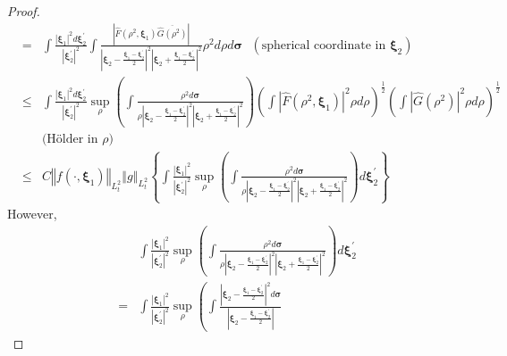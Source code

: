 \documentclass[reqno]{amsart}
\theoremstyle{plain}
\numberwithin{equation}{section}
\begin{document}
\begin{proof}
\begin{eqnarray*}
&=&\int \frac{\left\vert \mathbf{\xi }_{1}\right\vert ^{2}d\mathbf{\xi }_{2}^{\prime }}{\left\vert \mathbf{\xi }_{2}^{\prime }\right\vert ^{2}}\int 
\frac{\left\vert \hat{F}(\rho ^{2},\mathbf{\xi }_{1})\overline{\hat{G}(\rho
^{2})}\right\vert }{\left\vert \mathbf{\xi }_{2}-\frac{\mathbf{\xi }_{1}-\mathbf{\xi }_{2}^{\prime }}{2}\right\vert ^{2}\left\vert \mathbf{\xi }_{2}+\frac{\mathbf{\xi }_{1}-\mathbf{\xi }_{2}^{\prime }}{2}\right\vert ^{2}}\rho
^{2}d\rho d\mathbf{\sigma }\text{ }\left( \text{spherical coordinate in }\mathbf{\xi }_{2}\right) \\
&\leqslant &\int \frac{\left\vert \mathbf{\xi }_{1}\right\vert ^{2}d\mathbf{\xi }_{2}^{\prime }}{\left\vert \mathbf{\xi }_{2}^{\prime }\right\vert ^{2}}\sup_{\rho }\left( \int \frac{\rho ^{2}d\mathbf{\sigma }}{\rho \left\vert 
\mathbf{\xi }_{2}-\frac{\mathbf{\xi }_{1}-\mathbf{\xi }_{2}^{\prime }}{2}\right\vert ^{2}\left\vert \mathbf{\xi }_{2}+\frac{\mathbf{\xi }_{1}-\mathbf{\xi }_{2}^{\prime }}{2}\right\vert ^{2}}\right) \left( \int \left\vert \hat{F}(\rho ^{2},\mathbf{\xi }_{1})\right\vert ^{2}\rho d\rho \right) ^{\frac{1}{2}}\left( \int \left\vert \hat{G}(\rho ^{2})\right\vert ^{2}\rho d\rho
\right) ^{\frac{1}{2}} \\
&&\text{(H\"{o}lder in }\rho \text{)} \\
&\leqslant &C\left\Vert f(\cdot ,\mathbf{\xi }_{1})\right\Vert
_{L_{t}^{2}}\left\Vert g\right\Vert _{L_{t}^{2}}\left\{ \int \frac{\left\vert \mathbf{\xi }_{1}\right\vert ^{2}}{\left\vert \mathbf{\xi }_{2}^{\prime }\right\vert ^{2}}\sup_{\rho }\left( \int \frac{\rho ^{2}d\mathbf{\sigma }}{\rho \left\vert \mathbf{\xi }_{2}-\frac{\mathbf{\xi }_{1}-\mathbf{\xi }_{2}^{\prime }}{2}\right\vert ^{2}\left\vert \mathbf{\xi }_{2}+\frac{\mathbf{\xi }_{1}-\mathbf{\xi }_{2}^{\prime }}{2}\right\vert ^{2}}\right) d\mathbf{\xi }_{2}^{\prime }\right\}
\end{eqnarray*}However,\begin{eqnarray*}
&&\int \frac{\left\vert \mathbf{\xi }_{1}\right\vert ^{2}}{\left\vert 
\mathbf{\xi }_{2}^{\prime }\right\vert ^{2}}\sup_{\rho }\left( \int \frac{\rho ^{2}d\mathbf{\sigma }}{\rho \left\vert \mathbf{\xi }_{2}-\frac{\mathbf{\xi }_{1}-\mathbf{\xi }_{2}^{\prime }}{2}\right\vert ^{2}\left\vert \mathbf{\xi }_{2}+\frac{\mathbf{\xi }_{1}-\mathbf{\xi }_{2}^{\prime }}{2}\right\vert
^{2}}\right) d\mathbf{\xi }_{2}^{\prime } \\
&=&\int \frac{\left\vert \mathbf{\xi }_{1}\right\vert ^{2}}{\left\vert 
\mathbf{\xi }_{2}^{\prime }\right\vert ^{2}}\sup_{\rho }\left( \int \frac{\left\vert \mathbf{\xi }_{2}-\frac{\mathbf{\xi }_{1}-\mathbf{\xi }_{2}^{\prime }}{2}\right\vert ^{2}d\mathbf{\sigma }}{\left\vert \mathbf{\xi }_{2}-\frac{\mathbf{\xi }_{1}-\mathbf{\xi }_{2}^{\prime }}{2}\right\vert
}
\end{eqnarray*}
\end{proof}
\end{document}
